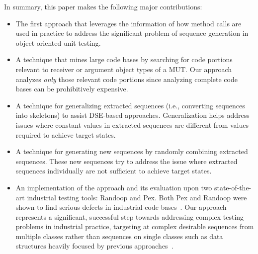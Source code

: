 \documentclass{sig-alternate}
\begin{document}
In summary, this paper makes the following major contributions:
\begin{itemize}
\item The first approach that leverages the information of how method calls are used in practice to address the significant problem of sequence generation in object-oriented unit testing.
\item A technique that mines large code bases by searching for code portions relevant to receiver or argument object types of a MUT. Our approach analyzes \emph{only} those relevant code portions since analyzing complete code bases can be prohibitively expensive. 
\item A technique for generalizing extracted sequences (i.e., converting sequences into skeletons) to assist DSE-based approaches. Generalization helps address issues where constant values in extracted sequences are different from values required to achieve target states.
\item A technique for generating new sequences by randomly combining extracted sequences. These new sequences try to address the issue where extracted sequences individually are not sufficient to achieve target states.
\item An implementation of the approach and its evaluation upon two state-of-the-art industrial testing tools: Randoop and Pex. Both Pex and Randoop were shown to find serious defects in industrial code bases~\cite{pacheco:feedback, tillman:pexwhite}. Our approach represents a significant, successful step towards addressing complex testing problems in industrial practice, targeting at complex desirable sequences from multiple classes rather than sequences on single classes such as data structures heavily focused by previous approaches~\cite{tonella:etoc,  inkumsah08:improving}.

\end{itemize}
\end{document}
